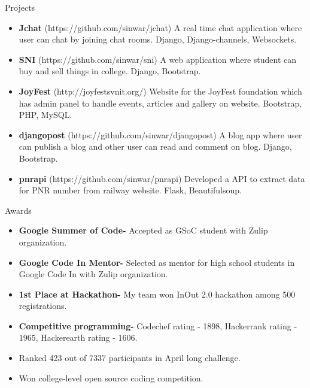 \documentclass[]{mcdowellcv}
\begin{document}
\begin{cvsection}{Projects}
	\begin{cvsubsection}{}{}{}
		\begin{itemize}
			\setlength\itemsep{3pt}
			\item \textbf{Jchat} (https://github.com/sinwar/jchat)  A real time chat application where user can chat by joining chat rooms. Django, Django-channels, Websockets.
			\item \textbf{SNI} (https://github.com/sinwar/sni)  A web application where student can buy and sell things in college. Django, Bootstrap.
			\item \textbf{JoyFest} (http://joyfestsvnit.org/)  Website for the JoyFest foundation which has admin panel to handle events, articles and gallery on website. Bootstrap, PHP, MySQL.
			\item \textbf{djangopost} (https://github.com/sinwar/djangopost)  A blog app where user can publish a blog and other user can read and comment on blog. Django, Bootstrap.
			\item \textbf{pnrapi} (https://github.com/sinwar/pnrapi)  Developed a API to extract data for PNR number from railway website. Flask, Beautifulsoup.
		\end{itemize}
	\end{cvsubsection}
\end{cvsection}
\begin{cvsection}{Awards}
	\begin{cvsubsection}{}{}{}
		\begin{itemize}
			\setlength\itemsep{3pt}
			\item \textbf{Google Summer of Code-}  Accepted as GSoC student with Zulip organization.
			\item \textbf{Google Code In Mentor-}  Selected as mentor for high school students in Google Code In with Zulip organization.
			\item \textbf{1st Place at Hackathon-}  My team won InOut 2.0 hackathon among 500 registrations.
			\item \textbf{Competitive programming-}  Codechef rating - 1898, Hackerrank rating - 1965, Hackerearth rating - 1606.
			\item  Ranked 423 out of 7337 participants in April long challenge.
			\item  Won college-level open source coding competition.
		\end{itemize}
	\end{cvsubsection}
\end{cvsection}
\ 
\end{document}
